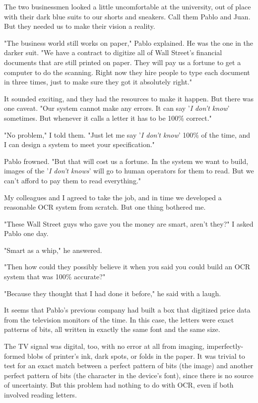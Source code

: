 \documentclass[10pt]{article}
\begin{document}
The two businessmen looked a little uncomfortable at the university, out of place with their dark blue suits to our shorts and sneakers. Call them Pablo and Juan. But they needed us to make their vision a reality.

"The business world still works on paper," Pablo explained. He was the one in the darker suit. "We have a contract to digitize all of Wall Street's financial documents that are still printed on paper. They will pay us a fortune to get a computer to do the scanning. Right now they hire people to type each document in three times, just to make sure they got it absolutely right."

It sounded exciting, and they had the resources to make it happen. But there was one caveat. "Our system cannot make any errors. It can say '\textit{I don’t know}' sometimes. But whenever it calls a letter it has to be 100\% correct."

"No problem," I told them. "Just let me say '\textit{I don’t know}' 100\% of the time, and I can design a system to meet your specification."

Pablo frowned. "But that will cost us a fortune. In the system we want to build, images of the '\textit{I don’t knows}' will go to human operators for them to read. But we can't afford to pay them to read everything."

My colleagues and I agreed to take the job, and in time we developed a reasonable OCR system from scratch. But one thing bothered me.

"These Wall Street guys who gave you the money are smart, aren't they?" I asked Pablo one day.

"Smart as a whip," he answered.

"Then how could they possibly believe it when you said you could build an OCR system that was 100\% accurate?"

"Because they thought that I had done it before," he said with a laugh.

It seems that Pablo's previous company had built a box that digitized price data from the television monitors of the time. In this case, the letters were exact patterns of bits, all written in exactly the same font and the same size.

The TV signal was digital, too, with no error at all from imaging, imperfectly-formed blobs of printer's ink, dark spots, or folds in the paper. It was trivial to test for an exact match between a perfect pattern of bits (the image) and another perfect pattern of bits (the character in the device’s font), since there is no source of uncertainty. But this problem had nothing to do with OCR, even if both involved reading letters.
\end{document}
